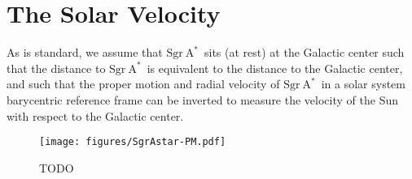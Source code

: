 \documentclass[modern]{aastex631}
\newcommand{\sgrA}{\ensuremath{\textrm{Sgr}~\textrm{A}^{*}}}
\begin{document}
\section{The Solar Velocity} \label{sec:vel}

As is standard, we assume that \sgrA\ sits (at rest) at the Galactic center such
that the distance to \sgrA\ is equivalent to the distance to the Galactic
center, and such that the proper motion and radial velocity of \sgrA\ in a solar
system barycentric reference frame can be inverted to measure the velocity of
the Sun with respect to the Galactic center.


\begin{figure}
    \begin{centering}
        \texttt{[image: figures/SgrAstar-PM.pdf]}
        \caption{TODO}
        \label{fig:SgrAstar-PM}
    \end{centering}
\end{figure}





\end{document}
